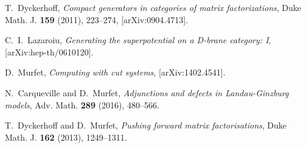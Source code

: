 \documentclass[english,letter paper,12pt,leqno]{article}
\theoremstyle{example}
\numberwithin{equation}{section}
\begin{document}

\providecommand{\bysame}{\leavevmode\hbox to3em{\hrulefill}\thinspace}
\providecommand{\href}[2]{#2}
\begin{thebibliography}{BHLS03}
  
T.~Dyckerhoff, \textsl{Compact generators in categories of matrix factorizations},
  Duke Math. J. \textbf{159} (2011), 223--274,
  \href{http://arxiv.org/abs/0904.4713}{[arXiv:0904.4713]}.
  
C.~I.~Lazaroiu, \textsl{Generating the superpotential on a D-brane category: I}, [arXiv:hep-th/0610120].
  
D.~Murfet, \textsl{Computing with cut systems}, \href{http://arxiv.org/abs/1402.4541}{[arXiv:1402.4541]}.

N.~Carqueville and D.~Murfet, \textsl{Adjunctions and defects in Landau-Ginzburg models}, Adv. Math. \textbf{289} (2016), 480--566.

T.~Dyckerhoff and D.~Murfet, \textsl{Pushing forward matrix factorisations}, Duke Math. J. \textbf{162} (2013), 1249--1311.

\end{thebibliography}
\end{document}
